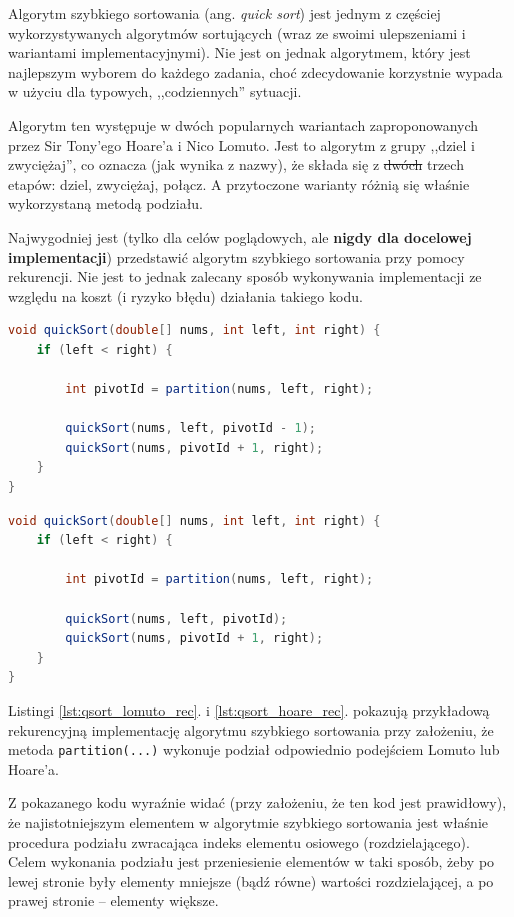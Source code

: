 \documentclass[twoside]{article}
\begin{document}
Algorytm szybkiego sortowania (ang. \textit{quick sort}) jest jednym z częściej wykorzystywanych algorytmów sortujących
(wraz ze swoimi ulepszeniami i wariantami implementacyjnymi). Nie jest on jednak algorytmem, który jest najlepszym
wyborem do każdego zadania, choć zdecydowanie korzystnie wypada w użyciu dla typowych, ,,codziennych'' sytuacji.

Algorytm ten występuje w dwóch popularnych wariantach zaproponowanych przez Sir Tony'ego Hoare'a i Nico Lomuto.
Jest to algorytm z grupy ,,dziel i zwyciężaj'', co oznacza (jak wynika z nazwy), że składa się z \st{dwóch} trzech etapów: dziel, zwyciężaj, połącz. A przytoczone warianty różnią się właśnie wykorzystaną metodą podziału.

Najwygodniej jest (tylko dla celów poglądowych, ale \textbf{nigdy dla docelowej implementacji}) przedstawić algorytm
szybkiego sortowania przy pomocy rekurencji. Nie jest to jednak zalecany sposób wykonywania implementacji ze względu
na koszt (i ryzyko błędu) działania takiego kodu.

\begin{lstlisting}[caption={QuickSort (met. Lomuto) -- poglądowa wersja rekurencyjna}, frame=tblr, language=Java, label={lst:qsort_lomuto_rec}]
void quickSort(double[] nums, int left, int right) {
    if (left < right) {

        int pivotId = partition(nums, left, right);

        quickSort(nums, left, pivotId - 1);
        quickSort(nums, pivotId + 1, right);
    }
}
\end{lstlisting}

\begin{lstlisting}[caption={QuickSort (met. Hoare'a) -- poglądowa wersja rekurencyjna}, frame=tblr, language=Java, label={lst:qsort_hoare_rec}]
void quickSort(double[] nums, int left, int right) {
    if (left < right) {

        int pivotId = partition(nums, left, right);

        quickSort(nums, left, pivotId);
        quickSort(nums, pivotId + 1, right);
    }
}
\end{lstlisting}

Listingi \ref{lst:qsort_lomuto_rec}. i \ref{lst:qsort_hoare_rec}. pokazują przykładową rekurencyjną implementację
algorytmu szybkiego sortowania przy założeniu, że metoda \verb|partition(...)| wykonuje podział odpowiednio 
podejściem Lomuto lub Hoare'a.

Z pokazanego kodu wyraźnie widać (przy założeniu, że ten kod jest prawidłowy), że najistotniejszym elementem 
w algorytmie szybkiego sortowania jest właśnie procedura podziału zwracająca indeks elementu osiowego (rozdzielającego).
Celem wykonania podziału jest przeniesienie elementów w taki sposób, żeby po lewej stronie były elementy mniejsze 
(bądź równe) wartości rozdzielającej, a po prawej stronie -- elementy większe.
\end{document}

